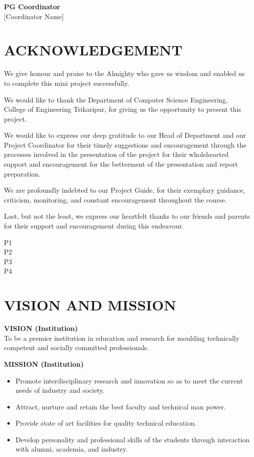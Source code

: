 \documentclass[12pt,a4paper]{report}
\begin{document}
\vspace{2cm}
\noindent
\textbf{PG Coordinator}\\
{[Coordinator Name]}

\clearpage

\chapter*{ACKNOWLEDGEMENT}
We give honour and praise to the Almighty who gave us wisdom and enabled us to complete this mini project successfully.

We would like to thank the Department of Computer Science Engineering, College of Engineering Trikaripur, for giving us the opportunity to present this project.

We would like to express our deep gratitude to our Head of Department and our Project Coordinator for their timely suggestions and encouragement through the processes involved in the presentation of the project for their wholehearted support and encouragement for the betterment of the presentation and report preparation.

We are profoundly indebted to our Project Guide, for their exemplary guidance, criticism, monitoring, and constant encouragement throughout the course.

Last, but not the least, we express our heartfelt thanks to our friends and parents for their support and encouragement during this endeavour.

\vspace{2cm}
\begin{flushright}
P1\\P2\\P3\\P4
\end{flushright}

\clearpage

\chapter*{VISION AND MISSION}
\textbf{VISION (Institution)}\\
To be a premier institution in education and research for moulding technically competent and socially committed professionals.

\vspace{0.5cm}
\textbf{MISSION (Institution)}\\
\begin{itemize}
    \item Promote interdisciplinary research and innovation so as to meet the current needs of industry and society.
    \item Attract, nurture and retain the best faculty and technical man power.
    \item Provide state of art facilities for quality technical education.
    \item Develop personality and professional skills of the students through interaction with alumni, academia, and industry.
\end{itemize}
\end{document}
